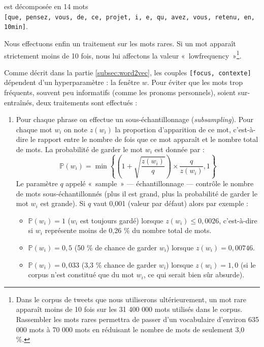 \documentclass[11pt,french,french]{article}
\providecommand{\tightlist}{%
  \setlength{\parskip}{0pt}
  }
\let\rmarkdownfootnote\footnote%
\def\footnote{\protect\rmarkdownfootnote}
\begin{document}
est décomposée en 14 mots
\texttt{{[}que,\ pensez,\ vous,\ de,\ ce,\ projet,\ i,\ e,\ qu,\ avez,\ vous,\ retenu,\ en,\ 10min{]}}.

Nous effectuons enfin un traitement sur les mots rares. Si un mot
apparaît strictement moins de 10 fois, nous lui affectons la valeur
«~lowfrequency~»\footnote{Dans le corpus de tweets que nous utiliserons
  ultérieurement, un mot rare apparaît moins de 10 fois sur les 31 400
  000 mots utilisés dans le corpus. Rassembler les mots rares permettra
  de passer d'un vocabulaire d'environ 635 000 mots à 70 000 mots en
  réduisant le nombre de mots de seulement 3,0 \%.}.

Comme décrit dans la partie \ref{subsec:word2vec}, les couples
\texttt{{[}focus,\ contexte{]}} dépendent d'un hyperparamètre : la
fenêtre \(w\). Pour éviter que les mots trop fréquents, souvent peu
informatifs (comme les pronoms personnels), soient sur-entraînés, deux
traitements sont effectués :

\begin{enumerate}
\def\labelenumi{\arabic{enumi}.}
\item
  Pour chaque phrase on effectue un sous-échantillonnage
  (\emph{subsampling}). Pour chaque mot \(w_i\) on note \(z(w_i)\) la
  proportion d'apparition de ce mot, c'est-à-dire le rapport entre le
  nombre de fois que ce mot apparaît et le nombre total de mots. La
  probabilité de garder le mot \(w_i\) est donnée par : \[
  \mathbb P(w_i) = \min\left\{\left(1+\sqrt{\frac{z(w_i)}{q}}  \right)
  \times
  \frac{q}{z(w_i)},1\right\}
  \] Le paramètre \(q\) appelé «~sample~» --- échantillonnage ---
  contrôle le nombre de mots sous-échantillonnés (plus il est grand,
  plus la probabilité de garder le mot \(w_i\) est grande). Si \(q\)
  vaut 0,001 (valeur par défaut) alors par exemple :

  \begin{itemize}
  \tightlist
  \item
    \(\mathbb P(w_i) = 1\) (\(w_i\) est toujours gardé) lorsque
    \(z(w_i)\leq 0,0026\), c'est-à-dire si \(w_i\) représente moins de
    0,26 \% du nombre total de mots.\\
  \item
    \(\mathbb P(w_i) = 0,5\) (50 \% de chance de garder \(w_i\)) lorsque
    \(z(w_i)=0,00746\).\\
  \item
    \(\mathbb P(w_i) = 0,033\) (3,3 \% chance de garder \(w_i\)) lorsque
    \(z(w_i)=1,0\) (si le corpus n'est constitué que du mot \(w_i\), ce
    qui serait bien sûr absurde).
  \end{itemize}
\end{enumerate}
\end{document}
